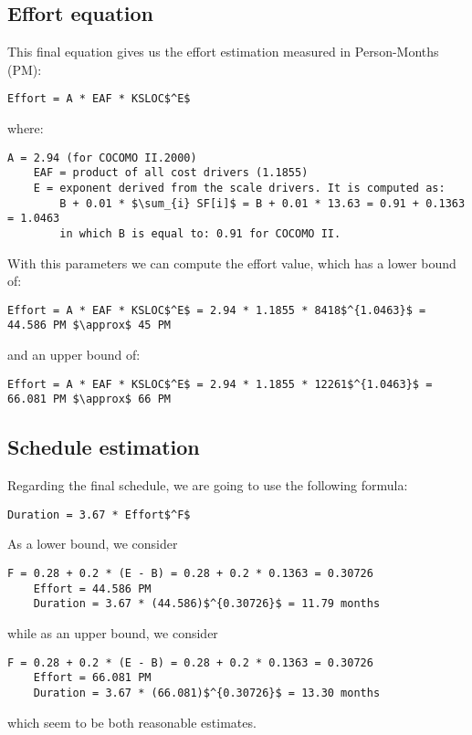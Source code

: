 \subsection{Effort equation}
This final equation gives us the effort estimation measured in Person-Months (PM):
\begin{lstlisting}[mathescape, numbers=none]
	Effort = A * EAF * KSLOC$^E$
\end{lstlisting}
where:
\begin{lstlisting}[mathescape, numbers=none]
	A = 2.94 (for COCOMO II.2000) 
	EAF = product of all cost drivers (1.1855)
	E = exponent derived from the scale drivers. It is computed as:
		B + 0.01 * $\sum_{i} SF[i]$ = B + 0.01 * 13.63 = 0.91 + 0.1363 = 1.0463
		in which B is equal to: 0.91 for COCOMO II.
\end{lstlisting}

With this parameters we can compute the effort value, which has a lower bound of:
\begin{lstlisting}[mathescape, numbers=none]
	Effort = A * EAF * KSLOC$^E$ = 2.94 * 1.1855 * 8418$^{1.0463}$ = 44.586 PM $\approx$ 45 PM
\end{lstlisting}
and an upper bound of:
\begin{lstlisting}[mathescape, numbers=none]
	Effort = A * EAF * KSLOC$^E$ = 2.94 * 1.1855 * 12261$^{1.0463}$ = 66.081 PM $\approx$ 66 PM
\end{lstlisting}

\subsection{Schedule estimation}
Regarding the final schedule, we are going to use the following formula:
\begin{lstlisting}[mathescape, numbers=none]
	Duration = 3.67 * Effort$^F$
\end{lstlisting}
As a lower bound, we consider
\begin{lstlisting}[mathescape, numbers=none]
	F = 0.28 + 0.2 * (E - B) = 0.28 + 0.2 * 0.1363 = 0.30726
	Effort = 44.586 PM 
	Duration = 3.67 * (44.586)$^{0.30726}$ = 11.79 months
\end{lstlisting}
while as an upper bound, we consider
\begin{lstlisting}[mathescape, numbers=none]
	F = 0.28 + 0.2 * (E - B) = 0.28 + 0.2 * 0.1363 = 0.30726
	Effort = 66.081 PM 
	Duration = 3.67 * (66.081)$^{0.30726}$ = 13.30 months
\end{lstlisting}
which seem to be both reasonable estimates.